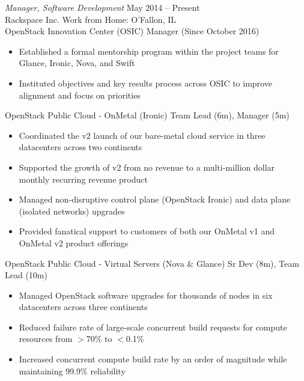 \documentclass[margin,line]{resume}
\begin{document}
\begin{resume}
{\sl Manager, Software Development}  \hfill  May 2014 -- Present\\
Rackspace Inc.  \hfill  Work from Home: O'Fallon, IL\\
{\small OpenStack Innovation Center (OSIC)  \hfill  Manager (Since October 2016)}
\begin{itemize} \itemsep -2pt %
\small\item Established a formal mentorship program within the project teams for Glance, Ironic, Nova, and Swift
\small\item Instituted objectives and key results process across OSIC to improve alignment and focus on priorities
\end{itemize}\vspace*{-\baselineskip} %
{\small OpenStack Public Cloud - OnMetal (Ironic)  \hfill  Team Lead (6m), Manager (5m)}
\begin{itemize} \itemsep -2pt %
\small\item Coordinated the v2 launch of our bare-metal cloud service in three datacenters across two continents
\small\item Supported the growth of v2 from no revenue to a multi-million dollar monthly recurring revenue product
\small\item Managed non-disruptive control plane (OpenStack Ironic) and data plane (isolated networks) upgrades
\small\item Provided fanatical support to customers of both our OnMetal v1 and OnMetal v2 product offerings
\end{itemize}\vspace*{-\baselineskip} %
{\small OpenStack Public Cloud - Virtual Servers (Nova \& Glance)  \hfill  Sr Dev (8m), Team Lead (10m)}
\begin{itemize} \itemsep -2pt %
\small\item Managed OpenStack software upgrades for thousands of nodes in six datacenters across three continents
\small\item Reduced failure rate of large-scale concurrent build requests for compute resources from $>$70\% to $<$0.1\%
\small\item Increased concurrent compute build rate by an order of magnitude while maintaining 99.9\% reliability
\end{itemize}


\end{resume}
\end{document}
